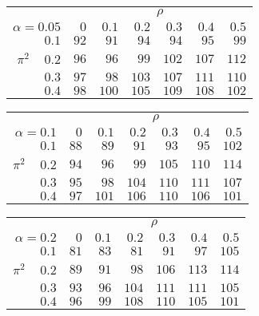 \begin{tabular}{r|rrrrrr}
\hline\hline
 &\multicolumn{6}{c}{$\rho$} \\ 
 $\alpha = 0.05$ & $0$ & $0.1$ & $0.2$ & $0.3$ & $0.4$ & $0.5$ \\ 
 \hline$0.1$ & $ 92$ & $ 91$ & $ 94$ & $ 94$ & $ 95$ & $ 99$\\ 
$\pi^2\;\;\;$ $0.2$ & $ 96$ & $ 96$ & $ 99$ & $102$ & $107$ & $112$\\ 
$0.3$ & $ 97$ & $ 98$ & $103$ & $107$ & $111$ & $110$\\ 
$0.4$ & $ 98$ & $100$ & $105$ & $109$ & $108$ & $102$\\ 
 \hline 
 \end{tabular}
 
 \vspace{2em} 
 
\begin{tabular}{r|rrrrrr}
\hline\hline
 &\multicolumn{6}{c}{$\rho$} \\ 
 $\alpha = 0.1$ & $0$ & $0.1$ & $0.2$ & $0.3$ & $0.4$ & $0.5$ \\ 
 \hline$0.1$ & $ 88$ & $ 89$ & $ 91$ & $ 93$ & $ 95$ & $102$\\ 
$\pi^2\;\;\;$ $0.2$ & $ 94$ & $ 96$ & $ 99$ & $105$ & $110$ & $114$\\ 
$0.3$ & $ 95$ & $ 98$ & $104$ & $110$ & $111$ & $107$\\ 
$0.4$ & $ 97$ & $101$ & $106$ & $110$ & $106$ & $101$\\ 
 \hline 
 \end{tabular}
 
 \vspace{2em} 
 
\begin{tabular}{r|rrrrrr}
\hline\hline
 &\multicolumn{6}{c}{$\rho$} \\ 
 $\alpha = 0.2$ & $0$ & $0.1$ & $0.2$ & $0.3$ & $0.4$ & $0.5$ \\ 
 \hline$0.1$ & $ 81$ & $ 83$ & $ 81$ & $ 91$ & $ 97$ & $105$\\ 
$\pi^2\;\;\;$ $0.2$ & $ 89$ & $ 91$ & $ 98$ & $106$ & $113$ & $114$\\ 
$0.3$ & $ 93$ & $ 96$ & $104$ & $111$ & $111$ & $105$\\ 
$0.4$ & $ 96$ & $ 99$ & $108$ & $110$ & $105$ & $101$\\ 
 \hline 
 \end{tabular}